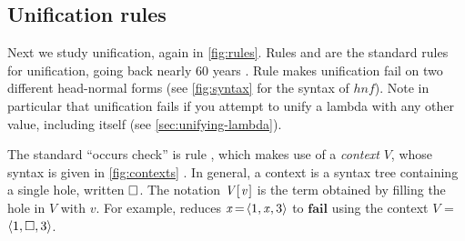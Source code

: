 \documentclass[acmsmall]{acmart}
\newcommand{\Conid}[1]{\mathit{#1}}
\newcommand{\Varid}[1]{\mathit{#1}}
\begin{document}
\subsection{Unification rules} \label{sec:unification-rules}

Next we study unification, again in \cref{fig:rules}.
Rules  and 
are the standard rules for unification, going back nearly 60 years \cite{robinson:unification}.
Rule  makes unification fail on two different head-normal forms (see
\cref{fig:syntax} for the syntax of \ensuremath{\mathit{hnf}}).
Note in particular that unification fails if you attempt to unify a
lambda with any other value, including itself (see \cref{sec:unifying-lambda}).

The standard ``occurs check'' is rule , which makes use of a
\emph{context} \ensuremath{\Conid{V}}, whose syntax is given in \cref{fig:contexts}
\cite{felleisen:contexts1,felleisen:contexts2}.
In general, a context is a syntax tree containing a single hole, written \ensuremath{\hole}.
The notation \ensuremath{\Conid{V} [\mskip1.5mu \Varid{v}\mskip1.5mu]} is the term obtained by filling the hole
in \ensuremath{\Conid{V}} with \ensuremath{\Varid{v}}.  For example,  reduces \ensuremath{\Varid{x}\hspace{-0.14em}=\hspace{-0.14em}\langle{}\mathrm{1},\Varid{x},\mathrm{3}\rangle} to \ensuremath{\textbf{fail}}
using the context \ensuremath{\Conid{V}} = \ensuremath{\langle{}\mathrm{1},\hole,\mathrm{3}\rangle}.


\end{document}
